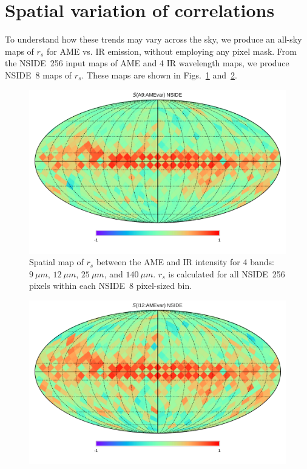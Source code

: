 \section{Spatial variation of correlations}
    To understand how these trends may vary across the sky, we produce an all-sky maps of $r_{s}$ for AME vs. IR emission, without employing any pixel mask. From the NSIDE~256 input maps of AME and 4 IR wavelength maps, we produce NSIDE~8 maps of $r_{s}$. These maps are shown in Figs.~\ref{fig:Spearman_Map_nside8_AMEtoIR_A9} and~\ref{fig:Spearman_Map_nside8_AMEtoIR_I12}.
      \begin{figure}
        \includegraphics[width=\textwidth]{../Plots/Allsky_Corr/Spearman_Map_nside8_A9toAMEvar.pdf}
        \centering
        \caption{Spatial map of $r_{s}$ between the AME and IR intensity for 4 bands:$9~\mu{}m$, $12~\mu{}m$, $25~\mu{}m$, and $140~\mu{}m$. $r_{s}$ is calculated for all NSIDE~256 pixels within each NSIDE~8 pixel-sized bin.}
        \label{fig:Spearman_Map_nside8_AMEtoIR_A9}
      \end{figure}
      \begin{figure}
        \includegraphics[width=\textwidth]{../Plots/Allsky_Corr/Spearman_Map_nside8_I12toAMEvar.pdf}
        \centering
        \caption{}
        \label{fig:Spearman_Map_nside8_AMEtoIR_I12}
      \end{figure}

